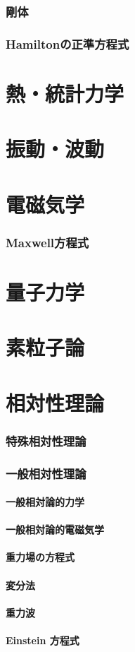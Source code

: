 \documentclass[dvipdfmx,uplatex]{jsarticle}
\begin{document}
  \section{剛体}
  \section{Hamiltonの正準方程式}
  \newpage

  \part{熱・統計力学}
  \newpage

  \part{振動・波動}
  \newpage

  \part{電磁気学}
  \section{Maxwell方程式}
  \newpage

  \part{量子力学}
  \newpage

  \part{素粒子論}
  \newpage

  \part{相対性理論}
  \section{特殊相対性理論}
  \section{一般相対性理論}
  \subsection{一般相対論的力学}
  \subsection{一般相対論的電磁気学}
  \subsection{重力場の方程式}
  \subsection{変分法}
  \subsection{重力波}
  \subsection{Einstein 方程式}
\end{document}
